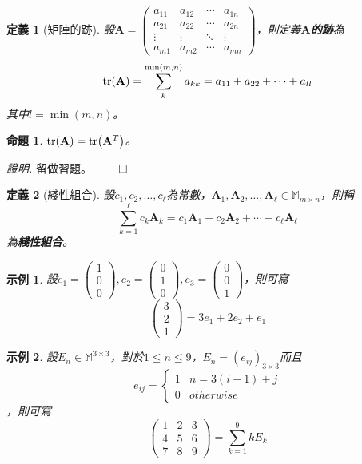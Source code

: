 \documentclass[12pt]{article}
\newtheorem{definition}{定義}
\newtheorem*{proposition}{命題}
\newtheorem*{example}{示例}
\renewenvironment*{proof}{\textit{證明.}}{\hfill$\qed$}
\begin{document}
    \begin{definition}[矩陣的跡]
        設$\mathbf{A}=\begin{pmatrix}
            a_{11}&a_{12}&\cdots&a_{1n}\\
            a_{21}&a_{22}&\cdots&a_{2n}\\
            \vdots&\vdots&\ddots&\vdots\\
            a_{m1}&a_{m2}&\cdots&a_{mn}
        \end{pmatrix}$，則定義\textbf{$\mathbf{A}$的跡}為$$\tr(\mathbf{A})=\sum_{k}^{\min(m,n)}a_{kk}=a_{11}+a_{22}+\cdots+a_{ll}$$其中$l=\min(m,n)$。
    \end{definition}

    \begin{proposition}
        $\tr(\mathbf{A})=\tr(\mathbf{A}^T)$。
    \end{proposition}
    \begin{proof}
        留做習題。
    \end{proof}
    
    \begin{definition}[綫性組合]
        設$c_1,c_2,\dots,c_\ell$為常數，$\mathbf{A}_1,\mathbf{A}_2,\dots,\mathbf{A}_\ell\in\mathbb{M}_{m\times n}$，則稱$$\sum_{k=1}^{\ell}c_k\mathbf{A}_k=c_1\mathbf{A}_1+c_2\mathbf{A}_2+\cdots+c_\ell\mathbf{A}_\ell$$為\textbf{綫性組合}。
    \end{definition}

    \begin{example}
        設$e_1=\begin{pmatrix}
            1\\0\\0
        \end{pmatrix},e_2=\begin{pmatrix}
            0\\1\\0
        \end{pmatrix},e_3=\begin{pmatrix}
            0\\0\\1
        \end{pmatrix}$，則可寫
            $$\begin{pmatrix}
                3\\2\\1
            \end{pmatrix}=3e_1+2e_2+e_1$$
    \end{example}

    \begin{example}
        設$E_n\in\mathbb{M}^{3\times 3}$，對於$1\leq n\leq 9$，$E_n=(e_{ij})_{3\times 3}$而且$$e_{ij}=\begin{cases}
            1 & n=3(i-1)+j\\ 0 & otherwise
        \end{cases}$$，則可寫
            $$\begin{pmatrix}
                1&2&3\\4&5&6\\7&8&9
            \end{pmatrix}=\sum_{k=1}^{9}kE_k$$
    \end{example}
\end{document}
